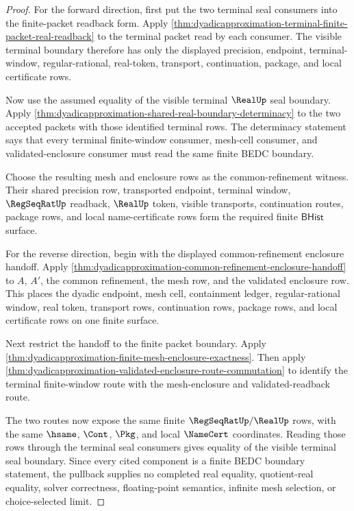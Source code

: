 \begin{proof}
For the forward direction, first put the two terminal seal consumers into the
finite-packet readback form. Apply
\autoref{thm:dyadicapproximation-terminal-finite-packet-real-readback} to the
terminal packet read by each consumer. The visible terminal boundary therefore
has only the displayed precision, endpoint, terminal-window,
regular-rational, real-token, transport, continuation, package, and local
certificate rows.

Now use the assumed equality of the visible terminal $\RealUp$ seal boundary.
Apply \autoref{thm:dyadicapproximation-shared-real-boundary-determinacy} to
the two accepted packets with those identified terminal rows. The determinacy
statement says that every terminal finite-window consumer, mesh-cell consumer,
and validated-enclosure consumer must read the same finite BEDC boundary.

Choose the resulting mesh and enclosure rows as the common-refinement witness.
Their shared precision row, transported endpoint, terminal window,
$\RegSeqRatUp$ readback, $\RealUp$ token, visible transports, continuation
routes, package rows, and local name-certificate rows form the required
finite $\mathsf{BHist}$ surface.

For the reverse direction, begin with the displayed common-refinement
enclosure handoff. Apply
\autoref{thm:dyadicapproximation-common-refinement-enclosure-handoff} to
$A$, $A'$, the common refinement, the mesh row, and the validated enclosure
row. This places the dyadic endpoint, mesh cell, containment ledger,
regular-rational window, real token, transport rows, continuation rows,
package rows, and local certificate rows on one finite surface.

Next restrict the handoff to the finite packet boundary. Apply
\autoref{thm:dyadicapproximation-finite-mesh-enclosure-exactness}. Then apply
\autoref{thm:dyadicapproximation-validated-enclosure-route-commutation} to
identify the terminal finite-window route with the mesh-enclosure and
validated-readback route.

The two routes now expose the same finite $\RegSeqRatUp/\RealUp$ rows, with
the same $\hsame$, $\Cont$, $\Pkg$, and local $\NameCert$ coordinates.
Reading those rows through the terminal seal consumers gives equality of the
visible terminal seal boundary. Since every cited component is a finite BEDC
boundary statement, the pullback supplies no completed real equality,
quotient-real equality, solver correctness, floating-point semantics,
infinite mesh selection, or choice-selected limit.
\end{proof}
